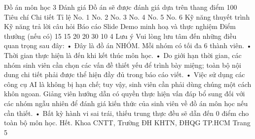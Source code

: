 Đồ án môn học
3 Đánh giá
Đồ án sẽ được đánh giá dựa trên thang điểm 100%
Tiêu chí Chi tiết
Tỉ lệ
No. 1
No. 2
No. 3
No. 4
No. 5
No. 6
Kỹ năng thuyết trình
Kỹ năng trả lời câu hỏi
Báo cáo
Slide
Demo minh hoạ và thực nghiệm
Điểm thưởng (nếu có)
15%
15%
20%
20%
30%
10%
4 Lưu ý
Vui lòng lưu tâm đến những điều quan trọng sau đây:
• Đây là đồ án NHÓM. Mỗi nhóm có tối đa 6 thành viên.
• Thời gian thực hiện là đến khi kết thúc môn học.
• Do giới hạn thời gian, các nhóm sinh viên cần chọn các vấn đề thiết yếu để trình bày miệng;
toàn bộ nội dung chi tiết phải được thể hiện đầy đủ trong báo cáo viết.
• Việc sử dụng các công cụ AI là không bị hạn chế; tuy vậy, sinh viên cần phải dùng chúng
một cách khôn ngoan. Giảng viên hướng dẫn có quyền thực hiện vấn đáp bổ sung đối với
các nhóm ngẫu nhiên để đánh giá kiến thức của sinh viên về đồ án môn học nếu cần thiết.
• Bất kỳ hành vi sai trái, thiếu trung thực đều sẽ dẫn đến 0 điểm cho toàn bộ môn học.
Hết.
Khoa CNTT, Trường ĐH KHTN, ĐHQG TP.HCM
Trang 5